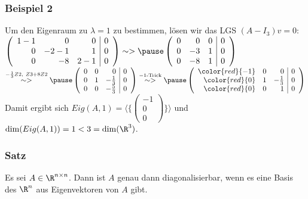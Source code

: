 %
\begin{frame}\frametitle{Beispiel 2}
Um den Eigenraum zu $\lambda=1$ zu bestimmen, lösen wir das LGS $(A-I_3)v=0$:\\\vfill \pause
$
\left(\begin{array}{rrr|r}
1-1 & 0 & 0& 0 \\ 0 & -2-1 & 1& 0 \\ 0 & -8 &2-1& 0
\end{array}\right)
\sim >\pause
\left(\begin{array}{rrr|r}
0 & 0 & 0& 0 \\ 0 & -3 & 1& 0 \\ 0 & -8 &1& 0
\end{array}\right)$\\\vspace{3mm}$
\stackrel{-\frac{1}{3}Z2,\ Z3+8Z2}{\sim >}\pause
\left(\begin{array}{rrr|r}
0 & 0 & 0& 0 \\ 0 & 1 & -\frac{1}{3}& 0 \\ 0 & 0 &-\frac{5}{3}& 0
\end{array}\right)
\stackrel{-1\text{-Trick}}{\sim >}\pause
\left(\begin{array}{rrr|r}
\color{red}{-1} & 0 & 0& 0 \\ \color{red}{0} & 1 & -\frac{1}{3}& 0 \\ \color{red}{0} & 0 &1& 0
\end{array}\right)
$
\vfill
Damit ergibt sich $Eig(A,1)=\langle \{\begin{pmatrix}-1 \\ 0\\0 \end{pmatrix}\} \rangle$ und $\dim(Eig(A,1))=1<3=\dim(\R^3)$.
\end{frame}
%
\begin{frame}\frametitle{Satz}
Es sei $A \in \R^{n\times n}$. Dann ist $A$ genau dann diagonalisierbar, wenn es eine Basis des $\R^n$ aus Eigenvektoren von $A$ gibt.\\

\end{frame}
%

